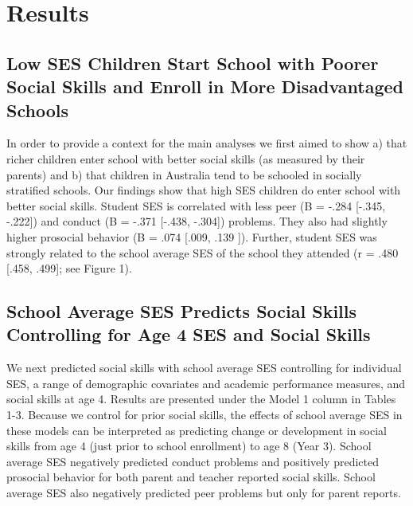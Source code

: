 \documentclass[
  english,
  man]{apa6}
\begin{document}
\hypertarget{results}{%
\section{Results}\label{results}}

\hypertarget{low-ses-children-start-school-with-poorer-social-skills-and-enroll-in-more-disadvantaged-schools}{%
\subsection{Low SES Children Start School with Poorer Social Skills and Enroll in More Disadvantaged Schools}\label{low-ses-children-start-school-with-poorer-social-skills-and-enroll-in-more-disadvantaged-schools}}

In order to provide a context for the main analyses we first aimed to show a) that richer children enter school with better social skills (as measured by their parents) and b) that children in Australia tend to be schooled in socially stratified schools. Our findings show that high SES children do enter school with better social skills. Student SES is correlated with less peer (B = -.284 {[}-.345, -.222{]}) and conduct (B = -.371 {[}-.438, -.304{]}) problems. They also had slightly higher prosocial behavior (B = .074 {[}.009, .139 {]}). Further, student SES was strongly related to the school average SES of the school they attended (r = .480 {[}.458, .499{]}; see Figure 1).

\hypertarget{school-average-ses-predicts-social-skills-controlling-for-age-4-ses-and-social-skills}{%
\subsection{School Average SES Predicts Social Skills Controlling for Age 4 SES and Social Skills}\label{school-average-ses-predicts-social-skills-controlling-for-age-4-ses-and-social-skills}}

We next predicted social skills with school average SES controlling for individual SES, a range of demographic covariates and academic performance measures, and social skills at age 4. Results are presented under the Model 1 column in Tables 1-3. Because we control for prior social skills, the effects of school average SES in these models can be interpreted as predicting change or development in social skills from age 4 (just prior to school enrollment) to age 8 (Year 3). School average SES negatively predicted conduct problems and positively predicted prosocial behavior for both parent and teacher reported social skills. School average SES also negatively predicted peer problems but only for parent reports.
\end{document}
